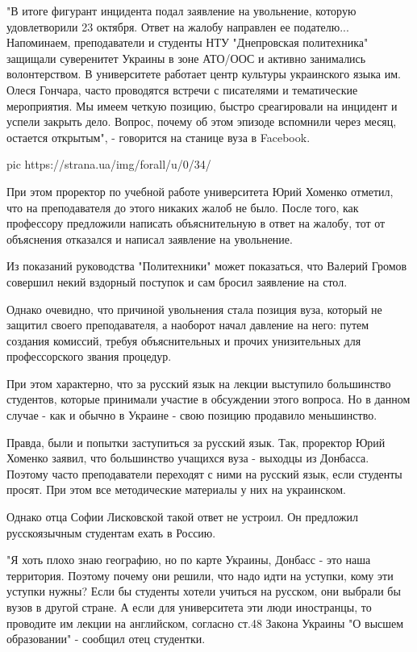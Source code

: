 "В итоге фигурант инцидента подал заявление на увольнение, которую
удовлетворили 23 октября. Ответ на жалобу направлен ее подателю...
Напоминаем, преподаватели и студенты НТУ "Днепровская политехника" защищали
суверенитет Украины в зоне АТО/ООС и активно занимались волонтерством. В
университете работает центр культуры украинского языка им. Олеся Гончара, часто
проводятся встречи с писателями и тематические мероприятия. Мы имеем четкую
позицию, быстро среагировали на инцидент и успели закрыть дело. Вопрос, почему
об этом эпизоде вспомнили через месяц, остается открытым", -
говорится на станице вуза в Facebook.

\ifcmt
pic https://strana.ua/img/forall/u/0/34/%
\fi

При этом проректор по учебной работе университета Юрий Хоменко отметил, что на
преподавателя до этого никаких жалоб не было. После того, как профессору
предложили написать объяснительную в ответ на жалобу, тот от объяснения
отказался и написал заявление на увольнение.

Из показаний руководства "Политехники" может показаться, что Валерий Громов
совершил некий вздорный поступок и сам бросил заявление на стол. 

Однако очевидно, что причиной увольнения стала позиция вуза, который не защитил
своего преподавателя, а наоборот начал давление на него: путем создания
комиссий, требуя объяснительных и прочих унизительных для профессорского звания
процедур. 

При этом характерно, что за русский язык на лекции выступило большинство
студентов, которые принимали участие в обсуждении этого вопроса. Но в данном
случае - как и обычно в Украине - свою позицию продавило меньшинство. 

Правда, были и попытки заступиться за русский язык. Так, проректор Юрий Хоменко
заявил, что большинство учащихся вуза - выходцы из Донбасса. Поэтому часто
преподаватели переходят с ними на русский язык, если студенты просят. При этом
все методические материалы у них на украинском. 

Однако отца Софии Лисковской такой ответ не устроил. Он предложил русскоязычным
студентам ехать в Россию. 

"Я хоть плохо знаю географию, но по карте Украины, Донбасс - это наша
территория. Поэтому почему они решили, что надо идти на уступки, кому эти
уступки нужны? Если бы студенты хотели учиться на русском, они выбрали бы вузов
в другой стране. А если для университета эти люди иностранцы, то проводите им
лекции на английском, согласно ст.48 Закона Украины "О высшем образовании" -
сообщил отец студентки.

